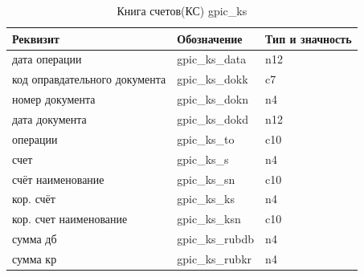 \begin{table}[h!]
    \centering
    \scriptsize
    \caption{Книга счетов(КС) gpic\_ks}
    \begin{tabular}{|l|l|l|} 

\hline
\textbf{Реквизит}               &\textbf{Обозначение}   &\textbf{Тип и значность}   \\ \hline
дата операции                   &gpic\_ks\_data         &n12                        \\ \hline
код оправдательного документа   &gpic\_ks\_dokk         &c7                         \\ \hline
номер документа                 &gpic\_ks\_dokn         &n4                         \\ \hline
дата документа                  &gpic\_ks\_dokd         &n12                        \\ \hline
операции                        &gpic\_ks\_to           &c10                        \\ \hline
счет                            &gpic\_ks\_s            &n4                         \\ \hline
счёт наименование               &gpic\_ks\_sn           &c10                        \\ \hline
кор. счёт                       &gpic\_ks\_ks           &n4                         \\ \hline
кор. счет наименование          &gpic\_ks\_ksn          &c10                        \\ \hline
сумма дб                        &gpic\_ks\_rubdb        &n4                         \\ \hline
сумма кр                        &gpic\_ks\_rubkr        &n4                         \\ \hline

    \end{tabular}
\end{table}

